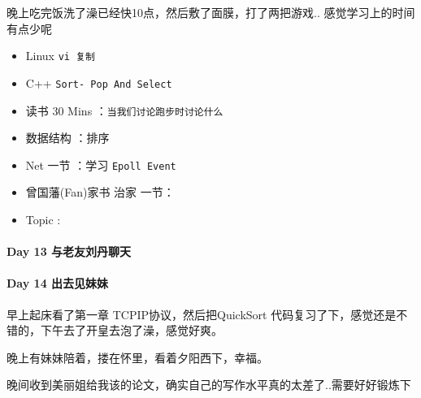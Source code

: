 \documentclass[UTF8,a4paper,8pt]{ctexart}
\begin{document}
	 	 晚上吃完饭洗了澡已经快10点，然后敷了面膜，打了两把游戏.. 感觉学习上的时间有点少呢
	 	 \begin{itemize}[itemindent = 1em]
	 	 	\renewcommand\labelitemi{\makebox[0pt][l]{$\square$}\hspace{1em}} 
	 	 	\renewcommand\labelitemi{\makebox[0pt][l]{$\square$}\raisebox{.15ex}{\hspace{0.1em}$\checkmark$}}	 	
	 	 	\item   Linux \verb|vi 复制|
	 	 	\item   C++   \verb|Sort- Pop And Select|
	 	 	
	 	 	\item   读书  30 Mins	：\verb|当我们讨论跑步时讨论什么|
	 	 	\item   数据结构 ：排序	
	 	 	\item   Net 一节 ：学习 \verb|Epoll Event|	
	 	 	\renewcommand\labelitemi{\makebox[0pt][l]{$\square$}\hspace{1em}} 
	 	 	
	 	 	
	 	 	\renewcommand\labelitemi{\makebox[0pt][l]{$\square$}\raisebox{.15ex}{\hspace{0.1em}$\checkmark$}}
	 	 	\item   曾国藩(Fan)家书 治家 一节：
	 	 	\item   Topic :
	 	 \end{itemize}
 	 \paragraph{Day 13  与老友刘丹聊天    \quad     }
 	 
 	 \paragraph{Day 14  出去见妹妹    \quad     }
 	 
	 	 早上起床看了第一章 TCPIP协议，然后把QuickSort  代码复习了下，感觉还是不错的，下午去了开皇去泡了澡，感觉好爽。
	 	 
	 	 晚上有妹妹陪着，搂在怀里，看着夕阳西下，幸福。
	 	 
	 	 晚间收到美丽姐给我该的论文，确实自己的写作水平真的太差了..需要好好锻炼下
	 	 
\end{document}
